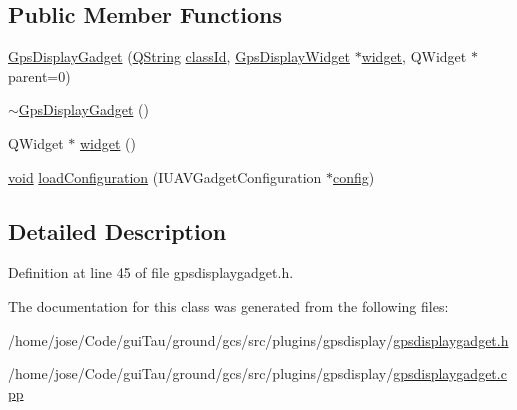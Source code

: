 \subsection*{Public Member Functions}
\begin{DoxyCompactItemize}
\item 
\hyperlink{group___g_p_s_gadget_plugin_ga748699eae5b29ee0958be37c23a348f8}{Gps\-Display\-Gadget} (\hyperlink{group___u_a_v_objects_plugin_gab9d252f49c333c94a72f97ce3105a32d}{Q\-String} \hyperlink{group___core_plugin_ga3878fde66a57220608960bcc3fbeef2c}{class\-Id}, \hyperlink{class_gps_display_widget}{Gps\-Display\-Widget} $\ast$\hyperlink{group___g_p_s_gadget_plugin_ga343958b41e6a9deb4720c9b3098396c2}{widget}, Q\-Widget $\ast$parent=0)
\item 
\hyperlink{group___g_p_s_gadget_plugin_ga6ec785be3eefba596601b671573f6401}{$\sim$\-Gps\-Display\-Gadget} ()
\item 
Q\-Widget $\ast$ \hyperlink{group___g_p_s_gadget_plugin_ga343958b41e6a9deb4720c9b3098396c2}{widget} ()
\item 
\hyperlink{group___u_a_v_objects_plugin_ga444cf2ff3f0ecbe028adce838d373f5c}{void} \hyperlink{group___g_p_s_gadget_plugin_gace7e777ca2b6d35514b22ec3b8d9f7c5}{load\-Configuration} (I\-U\-A\-V\-Gadget\-Configuration $\ast$\hyperlink{deflate_8c_a4473b5227787415097004fd39f55185e}{config})
\end{DoxyCompactItemize}


\subsection{Detailed Description}


Definition at line 45 of file gpsdisplaygadget.\-h.



The documentation for this class was generated from the following files\-:\begin{DoxyCompactItemize}
\item 
/home/jose/\-Code/gui\-Tau/ground/gcs/src/plugins/gpsdisplay/\hyperlink{gpsdisplaygadget_8h}{gpsdisplaygadget.\-h}\item 
/home/jose/\-Code/gui\-Tau/ground/gcs/src/plugins/gpsdisplay/\hyperlink{gpsdisplaygadget_8cpp}{gpsdisplaygadget.\-cpp}\end{DoxyCompactItemize}

